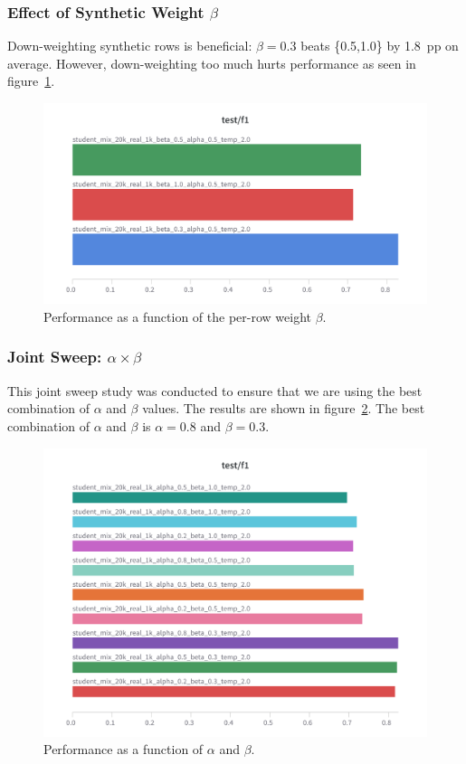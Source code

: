 \documentclass[11pt]{article}
\begin{document}
\subsubsection{Effect of Synthetic Weight $\beta$}
\label{sec:beta}
Down-weighting synthetic rows is beneficial: $\beta=0.3$ beats
\{0.5,1.0\} by 1.8~pp on average. However, down-weighting too much
hurts performance as seen in figure~\ref{fig:beta}.
\begin{figure}[htbp]
  \centering
  \includegraphics[width=.9\linewidth]{figures/student_beta.png}
  \caption{Performance as a function of the per-row weight $\beta$.}
  \label{fig:beta}
\end{figure}

\subsubsection{Joint Sweep: $\alpha\times\beta$}
This joint sweep study was conducted to ensure that we are using the
best combination of
$\alpha$ and $\beta$ values. The results are shown in
figure~\ref{fig:alpha-beta}. The best combination of $\alpha$ and $\beta$ is
$\alpha=0.8$ and $\beta=0.3$.

\begin{figure}[htbp]
  \centering
  \includegraphics[width=.9\linewidth]{figures/student_alpha_beta.png}
  \caption{Performance as a function of $\alpha$ and $\beta$.}
  \label{fig:alpha-beta}
\end{figure}
\end{document}
